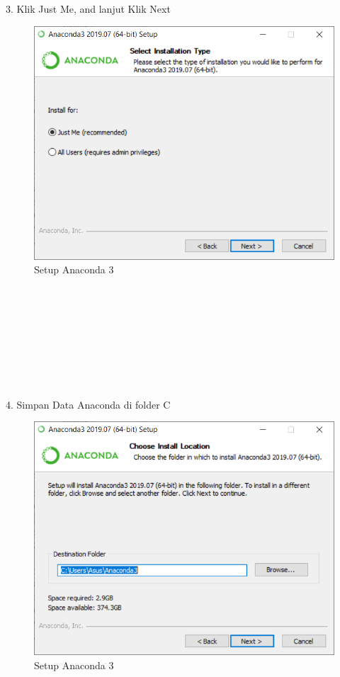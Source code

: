 \documentclass{article}
\begin{document}
3. Klik Just Me, and lanjut Klik Next\\
\begin{figure}[h]
	\centering
		\includegraphics[scale=0.5]{Gambar/A3.PNG}
		\caption{Setup Anaconda 3}
\end{figure}
\\
\\
\\
\\
\\
\\
\\
\\
4. Simpan Data Anaconda di folder C\\
\begin{figure}[h]
	\centering
		\includegraphics[scale=0.5]{Gambar/A4.PNG}
		\caption{Setup Anaconda 3}
\end{figure}
\end{document}
